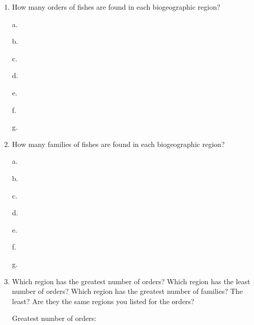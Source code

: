 \documentclass[11pt]{article}
\begin{document}
\begin{enumerate}[resume, leftmargin=*]
\item How many orders of fishes are found in each biogeographic region?

\begin{multicols}{2}
a.\vspace{0.5\baselineskip}

b.\vspace{0.5\baselineskip}

c.\vspace{0.5\baselineskip}

d.\vspace{0.5\baselineskip}

e.\vspace{0.5\baselineskip}

f.\vspace{0.5\baselineskip}

g.\vspace{0.5\baselineskip}
\end{multicols}

\item  How many families of fishes are found in each biogeographic
region?


\begin{multicols}{2}
a.\vspace{0.5\baselineskip}

b.\vspace{0.5\baselineskip}

c.\vspace{0.5\baselineskip}

d.\vspace{0.5\baselineskip}

e.\vspace{0.5\baselineskip}

f.\vspace{0.5\baselineskip}

g.\vspace{0.5\baselineskip}
\end{multicols}

\item Which region has the greatest number of orders? Which region has the
least number of orders? Which region has the greatest number of
families? The least? Are they the same regions you listed for the
orders?

\begin{multicols}{2}

Greatest number of orders: \vspace{2\baselineskip}


\end{multicols}
\end{enumerate}
\end{document}
